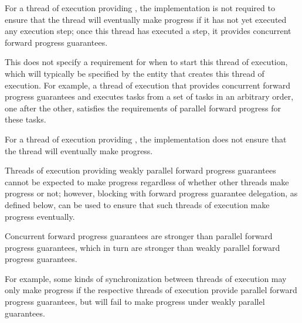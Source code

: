 \pnum
{}%
For a thread of execution providing ,
the implementation is not required to ensure that the thread will eventually make
progress if it has not yet executed any execution step; once this thread has
executed a step, it provides concurrent forward progress guarantees.

\pnum
\begin{note}
This does not specify a requirement for when to start this thread of execution,
which will typically be specified by the entity that creates this thread of
execution. For example, a thread of execution that provides concurrent forward
progress guarantees and executes tasks from a set of tasks in an arbitrary order,
one after the other, satisfies the requirements of parallel forward progress for
these tasks.
\end{note}

\pnum
{}%
For a thread of execution providing , the implementation does not ensure that the thread will eventually
make progress.

\pnum
\begin{note}
Threads of execution providing weakly parallel forward progress guarantees cannot
be expected to make progress regardless of whether other threads make progress or
not; however, blocking with forward progress guarantee delegation, as defined below,
can be used to ensure that such threads of execution make progress eventually.
\end{note}

\pnum
Concurrent forward progress guarantees are stronger than parallel forward progress
guarantees, which in turn are stronger than weakly parallel forward progress
guarantees.
\begin{note}
For example, some kinds of synchronization between threads of execution may only
make progress if the respective threads of execution provide parallel forward progress
guarantees, but will fail to make progress under weakly parallel guarantees.
\end{note}

